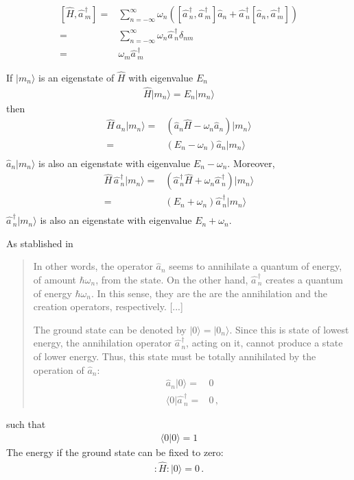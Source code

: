\begin{frame}
\begin{align}
\label{eq:20}
   \left[\widehat{H},\widehat{a\,}_{m}^\dagger\right]=&
\sum_{n=-\infty}^{\infty} \omega_n\left(
\left[\widehat{a\,}_{n}^\dagger,\widehat{a\,}_{m}^\dagger\right]\widehat{a}_{n}
+\widehat{a\,}_{n}^\dagger\left[\widehat{a}_{n},\widehat{a\,}_{m}^\dagger\right]
\right)\nonumber\\
=&\sum_{n=-\infty}^{\infty} \omega_n
\widehat{a\,}_{n}^\dagger\delta_{n m}
\nonumber\\
=& \omega_m\widehat{a\,}_{m}^\dagger
\end{align}

If $|m_n\rangle$ is an eigenstate of $\widehat{H}$ with eigenvalue $E_n$
\begin{align}
  \widehat{H}|m_n\rangle=E_n|m_n\rangle
\end{align}
then
\begin{align}
  \widehat{H}\,\widehat{a}_{n}|m_n\rangle=&
\left(\widehat{a}_{n}\widehat{H}-\omega_n\widehat{a}_{n}\right)|m_n\rangle\nonumber\\
=&\left(E_n-\omega_n\right)\widehat{a}_{n}|m_n\rangle\nonumber\\
\end{align}
$\widehat{a}_{n}|m_n\rangle$ is also an eigenstate with eigenvalue $E_n-\omega_n$. Moreover,
\begin{align}
  \widehat{H}\,\widehat{a\,}_{n}^\dagger|m_n\rangle=&
\left(\widehat{a\,}_{n}^\dagger\widehat{H}+\omega_n\widehat{a\,}_{n}^\dagger\right)|m_n\rangle\nonumber\\
=&\left(E_n+\omega_n\right)\widehat{a\,}_{n}^\dagger|m_n\rangle\nonumber\\
\end{align}
$\widehat{a\,}_{n}^\dagger|m_n\rangle$ is also an eigenstate with eigenvalue $E_n+\omega_n$. 

As stablished in \cite{Lahiri:2005sm}
\begin{quote}
  In other words, the operator $\widehat{a}_{n}$ seems to annihilate a quantum of energy, of amount $\hbar\omega_n$, from the state. On the other hand, 
  $\widehat{a\,}_{n}^\dagger$ creates a quantum of energy $\hbar\omega_n$. In this sense, they are the are the annihilation and the creation operators, respectively. [...]

The ground state can be denoted by $|0\rangle=|0_n\rangle$. Since this is state of lowest energy, the annihilation operator $\widehat{a\,}_{n}^\dagger$,
acting on it, cannot produce a state of lower energy. Thus, this state must be totally annihilated by the operation of $\widehat{a}_{n}$:
\begin{align}
  \widehat{a}_{n}|0\rangle=&0\nonumber\\
\langle0|\widehat{a\,}_{n}^\dagger=&0\,,
\end{align}
\end{quote}
such that
\begin{align}
  \langle0|0\rangle=1
\end{align}
The energy if the ground state can be fixed to zero:
\begin{align}
  :\widehat{H}:|0\rangle=0\,.
\end{align}


\end{frame}
